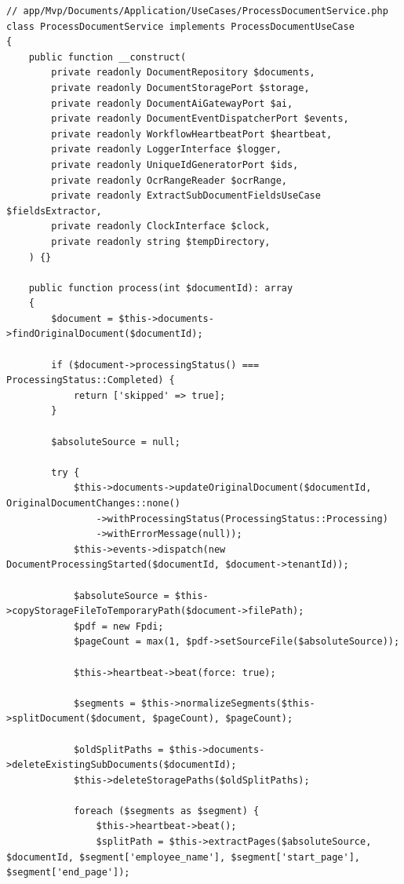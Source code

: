 \documentclass[a4paper,12pt]{article}
\begin{document}
\begin{sloppypar}
\begin{lstlisting}[style=phplisting, caption={ProcessDocumentService -- Facade su repository, storage, gateway AI, eventi ed heartbeat dietro process()}]
// app/Mvp/Documents/Application/UseCases/ProcessDocumentService.php
class ProcessDocumentService implements ProcessDocumentUseCase
{
    public function __construct(
        private readonly DocumentRepository $documents,
        private readonly DocumentStoragePort $storage,
        private readonly DocumentAiGatewayPort $ai,
        private readonly DocumentEventDispatcherPort $events,
        private readonly WorkflowHeartbeatPort $heartbeat,
        private readonly LoggerInterface $logger,
        private readonly UniqueIdGeneratorPort $ids,
        private readonly OcrRangeReader $ocrRange,
        private readonly ExtractSubDocumentFieldsUseCase $fieldsExtractor,
        private readonly ClockInterface $clock,
        private readonly string $tempDirectory,
    ) {}

    public function process(int $documentId): array
    {
        $document = $this->documents->findOriginalDocument($documentId);

        if ($document->processingStatus() === ProcessingStatus::Completed) {
            return ['skipped' => true];
        }

        $absoluteSource = null;

        try {
            $this->documents->updateOriginalDocument($documentId, OriginalDocumentChanges::none()
                ->withProcessingStatus(ProcessingStatus::Processing)
                ->withErrorMessage(null));
            $this->events->dispatch(new DocumentProcessingStarted($documentId, $document->tenantId));

            $absoluteSource = $this->copyStorageFileToTemporaryPath($document->filePath);
            $pdf = new Fpdi;
            $pageCount = max(1, $pdf->setSourceFile($absoluteSource));

            $this->heartbeat->beat(force: true);

            $segments = $this->normalizeSegments($this->splitDocument($document, $pageCount), $pageCount);

            $oldSplitPaths = $this->documents->deleteExistingSubDocuments($documentId);
            $this->deleteStoragePaths($oldSplitPaths);

            foreach ($segments as $segment) {
                $this->heartbeat->beat();
                $splitPath = $this->extractPages($absoluteSource, $documentId, $segment['employee_name'], $segment['start_page'], $segment['end_page']);


\end{lstlisting}
\end{sloppypar}
\end{document}
